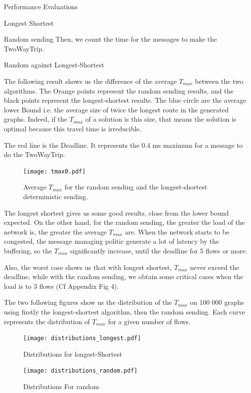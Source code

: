 \documentclass[a4paper,10pt]{report}
\begin{document}
\begin{chapter}{Performance Evaluations}
\begin{section}{Longest Shortest}
\begin{subsection}{Random sending}
Then, we count the time for the messages to make the TwoWayTrip.
\end{subsection}

\begin{subsection}{Random against Longest-Shortest}
 
The following result shows us the difference of the average $T_{max}$ between the two algorithms.
The Orange points represent the random sending results, and the black points represent the longest-shortest results.
The blue circle are the average lower Bound i.e. the average size of twice the longest route in the generated graphs.
Indeed, if the $T_{max}$ of a solution is this size, that means the solution is optimal because this travel time is irreducible.

The red line is the Deadline. It represents the 0.4 ms maximum for a message to do the TwoWayTrip.

\begin{figure}[H]
\hspace*{-3cm}
\centering
\texttt{[image: tmax0.pdf]}%
\caption{Average $T_{max}$ for the random sending and the longest-shortest deterministic sending.}
\end{figure}

The longest shortest gives us some good results, close from the lower bound expected. On the other hand, for the random sending, 
the greater the load of the network is, the greater the average $T_{max}$ are. When the network starts to be congested, the 
message managing politic generate a lot of latency by the buffering, so the $T_{max}$ significantly increase, until the deadline for 5 flows or more.


Also, the worst case shows us that with longest shortest, $T_{max}$ never exceed the deadline, while with the random sending, we obtain some
critical cases when the load is to 3 flows (Cf Appendix Fig 4).


The two following figures show us the distribution of the $T_{max}$ on 100 000 graphs using firstly the longest-shortest algorithm, then the
random sending.
Each curve represents the distribution of $T_{max}$ for a given number of flows.
\begin{figure}[H]
\hspace*{-4cm}
\centering
\texttt{[image: distributions\_longest.pdf]}%
\caption{Distributions for longest-Shortest}
\end{figure}

\begin{figure}[H]
\hspace*{-3cm}
\centering
\texttt{[image: distributions\_random.pdf]}%
\caption{Distributions For random}
\end{figure}


\end{subsection}
\end{section}
\end{chapter}
\end{document}

